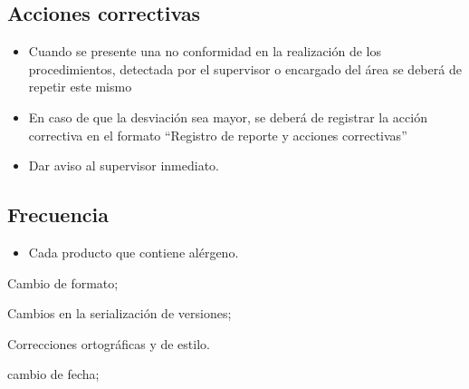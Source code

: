 \subsection{Acciones correctivas}
\begin{itemize}
	\item Cuando se presente una no conformidad en la realización de los procedimientos, detectada por el supervisor o encargado del área se deberá de repetir este mismo
	\item En caso de que la desviación sea mayor, se deberá de registrar la acción correctiva en el formato “Registro de reporte y acciones correctivas”
	\item Dar aviso al supervisor inmediato.
\end{itemize}

\subsection{Frecuencia}
\begin{itemize}
	\item Cada producto que contiene alérgeno.
\end{itemize}

\begin{changelog}[simple, sectioncmd=\subsection*,label=changelog-\thesection-\MayorVer.\MenorVer]
	\begin{version}[v=\MayorVer.\MenorVer, date=2023--01, author=Pablo E. Alanis]
		\item Cambio de formato;
		\item Cambios en la serialización de versiones;
		\item Correcciones ortográficas y de estilo.
	\end{version}

	\begin{version}[v=1.7, date=2022--05, author=Alonso M.]
		\item cambio de fecha;
	\end{version}

\end{changelog}
